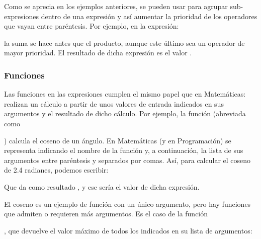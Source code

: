 \documentclass[a4paper,12pt,spanish]{sphinxmanual}
\begin{document}
Como se aprecia en los ejemplos anteriores, se pueden usar  para
agrupar sub-expresiones dentro de una expresión y así aumentar la prioridad de
los operadores que vayan entre paréntesis. Por ejemplo, en la expresión:

%
\begin{sphinxVerbatim}[commandchars=\\\{\}]
    
\end{sphinxVerbatim}

la suma se hace antes que el producto, aunque este último sea un operador de
mayor prioridad. El resultado de dicha expresión es el valor .


\subsubsection{Funciones}
\label{\detokenize{php:funciones}}
\ignorespaces 
Las funciones en las expresiones cumplen el mismo papel que en Matemáticas:
realizan un cálculo a partir de unos valores de entrada indicados en sus
argumentos y  el resultado de dicho cálculo. Por ejemplo, la
función  (abreviada como %
\begin{footnote}[3]\sphinxAtStartFootnote
{}
%
\end{footnote}) calcula el coseno de un ángulo. En
Matemáticas (y en Programación) se representa indicando el nombre de la
función y, a continuación, la lista de sus argumentos entre paréntesis y
separados por comas. Así, para calcular el coseno de 2.4 radianes, podemos
escribir:

%
\begin{sphinxVerbatim}[commandchars=\\\{\}]
\end{sphinxVerbatim}

Que da como resultado , y ese sería el valor de dicha
expresión.

El coseno es un ejemplo de función con un único argumento, pero hay funciones
que admiten o requieren más argumentos. Es el caso de la función %
\begin{footnote}[4]\sphinxAtStartFootnote
{}
%
\end{footnote}, que
devuelve el valor máximo de todos los indicados en su lista de argumentos:
\end{document}
